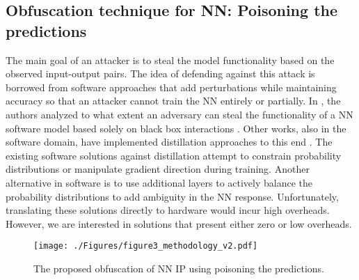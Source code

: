 \documentclass[10pt, twocolumn, conference]{IEEEtran}
\begin{document}
\subsection{Obfuscation technique for NN: Poisoning the predictions} \label{sec:cad_flow}
The main goal of an attacker is to steal the model functionality based on the observed input-output pairs. The idea of defending against this attack is borrowed from software approaches that add perturbations while maintaining accuracy so that an attacker cannot train the NN entirely or partially. In \cite{rfknockoff}, the authors analyzed to what extent an adversary can steal the functionality of a NN software model based solely on black box interactions \cite{rfknockoff}. Other works, also in the software domain, have implemented distillation approaches to this end \cite{rfPrdPsn, rfrvrsgmd}. The existing software solutions against distillation attempt to constrain probability distributions or manipulate gradient direction during training. Another alternative in software is to use additional layers to actively balance the probability distributions to add ambiguity in the NN response. Unfortunately, translating these solutions directly to hardware would incur high overheads. However, we are interested in solutions that present either zero or low overheads. %


 \label{sec:WS}
\begin{figure}[tb]
\centering
{\texttt{[image: ./Figures/figure3\_methodology\_v2.pdf]}} \vspace{-10pt}
\caption{The proposed obfuscation of NN IP using poisoning the predictions.}\vspace{-10pt}
\label{figcir}
\end{figure}
\end{document}
